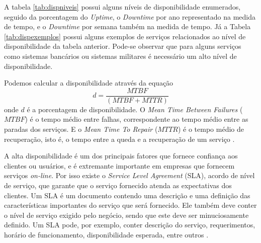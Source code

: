 A tabela \ref{tab:dispniveis} possui alguns níveis de disponibilidade enumerados, seguido da porcentagem do \textit{Uptime}, 
o \textit{Downtime} por ano representado na medida de tempo, e o \textit{Downtime} por semana também na medida de tempo. 
Já a Tabela \ref{tab:dispexemplos} possui alguns exemplos de serviços relacionados ao nível de disponibilidade da tabela anterior. 
Pode-se observar que para alguns serviços como sistemas bancários ou sistemas militares é necessário um alto nível de disponibilidade.

Podemos calcular a disponibilidade através da equação
\begin{equation}
d = \frac{MTBF}{(MTBF + MTTR)}
\label{diponibilidade}
\end{equation}
onde $d$ é a porcentagem de disponibilidade. O \textit{Mean Time Between Failures} ($MTBF$) é o tempo médio entre falhas, correspondente ao tempo médio 
entre as paradas dos serviços. E o \textit{Mean Time To Repair} ($MTTR$) é o tempo médio de recuperação, isto é, o tempo 
entre a queda e a recuperação de um serviço \cite{goncalves2009}.

A alta disponibilidade é um dos principais fatores que fornece confiança aos clientes ou usuários, e é
extremante importante em empresas que fornecem serviços \textit{on-line}. Por isso existe o \textit{Service Level Agreement} (SLA), 
acordo de nível de serviço, que garante que o serviço fornecido atenda as expectativas dos clientes. Um SLA é um documento contendo uma
descrição e uma definição das características importantes do serviço que será fornecido. Ele também deve conter o nível de serviço exigido
pelo negócio, sendo que este deve ser minuciosamente definido. Um SLA pode, por exemplo, conter descrição do serviço, requerimentos, horário de funcionamento,
disponibilidade esperada, entre outros \cite{smith2010}.


